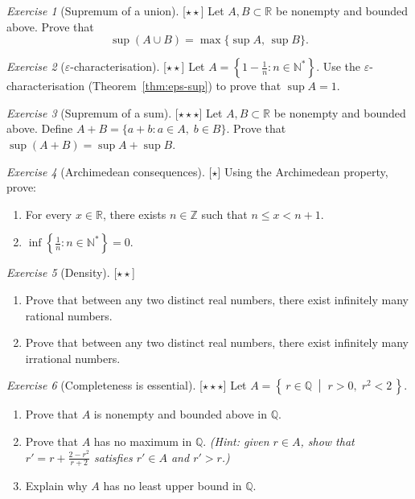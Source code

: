 \documentclass[12pt,a4paper,openany]{book}
\newcommand{\N}{\mathbb{N}}
\newcommand{\Z}{\mathbb{Z}}
\newcommand{\Q}{\mathbb{Q}}
\newcommand{\R}{\mathbb{R}}
\newcommand{\eps}{\varepsilon}
\newcommand{\setcond}[2]{\left\{\,#1\;\middle|\;#2\,\right\}}
\theoremstyle{definition}
\theoremstyle{remark}
\newtheorem{exercise}{Exercise}[chapter]
\newcommand{\easy}{\textnormal{[$\star$]}}
\newcommand{\medium}{\textnormal{[$\star\star$]}}
\newcommand{\hard}{\textnormal{[$\star\star\star$]}}
\begin{document}
\begin{exercise}[Supremum of a union]\label{exo:sup-union}\medium
Let $A, B \subset \R$ be nonempty and bounded above.  Prove that
\[
  \sup(A \cup B) = \max\{\sup A,\, \sup B\}.
\]
\end{exercise}

\begin{exercise}[$\eps$-characterisation]\label{exo:eps-char}\medium
Let $A = \left\{1 - \frac{1}{n} : n \in \N^*\right\}$.  Use the
$\eps$-characterisation (Theorem~\ref{thm:eps-sup}) to prove that
$\sup A = 1$.
\end{exercise}

\begin{exercise}[Supremum of a sum]\label{exo:sup-sum}\hard
Let $A, B \subset \R$ be nonempty and bounded above.  Define
$A + B = \{a + b : a \in A,\; b \in B\}$.  Prove that
$\sup(A+B) = \sup A + \sup B$.
\end{exercise}

\begin{exercise}[Archimedean consequences]\label{exo:arch}\easy
Using the Archimedean property, prove:
\begin{enumerate}[label=(\alph*)]
  \item For every $x \in \R$, there exists $n \in \Z$ such that $n \leq x < n+1$.
  \item $\inf\left\{\frac{1}{n} : n \in \N^*\right\} = 0$.
\end{enumerate}
\end{exercise}

\begin{exercise}[Density]\label{exo:density}\medium
\begin{enumerate}[label=(\alph*)]
  \item Prove that between any two distinct real numbers, there exist
    infinitely many rational numbers.
  \item Prove that between any two distinct real numbers, there exist
    infinitely many irrational numbers.
\end{enumerate}
\end{exercise}

\begin{exercise}[Completeness is essential]\label{exo:completeness}\hard
Let $A = \setcond{r \in \Q}{r > 0,\; r^2 < 2}$.
\begin{enumerate}[label=(\alph*)]
  \item Prove that $A$ is nonempty and bounded above in $\Q$.
  \item Prove that $A$ has no maximum in $\Q$.  \textit{(Hint: given
    $r \in A$, show that $r' = r + \frac{2-r^2}{r+2}$ satisfies
    $r' \in A$ and $r' > r$.)}
  \item Explain why $A$ has no least upper bound in $\Q$.
\end{enumerate}
\end{exercise}
\end{document}
